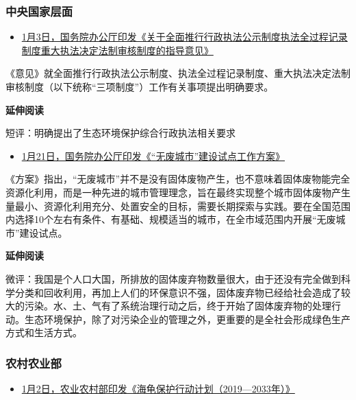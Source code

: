 \documentclass[]{book}
\providecommand{\tightlist}{%
  \setlength{\itemsep}{0pt}\setlength{\parskip}{0pt}}
\begin{document}
\hypertarget{ux4e2dux592eux56fdux5bb6ux5c42ux9762-2}{%
\subsubsection*{中央国家层面}\label{ux4e2dux592eux56fdux5bb6ux5c42ux9762-2}}

\begin{itemize}
\tightlist
\item
  \href{http://www.gov.cn/xinwen/2019-01/03/content_5354578.htm}{1月3日，国务院办公厅印发《关于全面推行行政执法公示制度执法全过程记录制度重大执法决定法制审核制度的指导意见》}
\end{itemize}

《意见》就全面推行行政执法公示制度、执法全过程记录制度、重大执法决定法制审核制度（以下统称``三项制度''）工作有关事项提出明确要求。

\textbf{延伸阅读}

短评：明确提出了生态环境保护综合行政执法相关要求

\begin{itemize}
\tightlist
\item
  \href{http://www.gov.cn/zhengce/content/2019-01/21/content_5359620.htm}{1月21日，国务院办公厅印发《``无废城市''建设试点工作方案》}
\end{itemize}

《方案》指出，``无废城市''并不是没有固体废物产生，也不意味着固体废物能完全资源化利用，而是一种先进的城市管理理念，旨在最终实现整个城市固体废物产生量最小、资源化利用充分、处置安全的目标，需要长期探索与实践。要在全国范围内选择10个左右有条件、有基础、规模适当的城市，在全市域范围内开展``无废城市''建设试点。

\textbf{延伸阅读}

微评：我国是个人口大国，所排放的固体废弃物数量很大，由于还没有完全做到科学分类和回收利用，再加上人们的环保意识不强，固体废弃物已经给社会造成了较大的污染。水、土、气有了系统治理行动之后，终于开始了固体废弃物的处理行动。生态环境保护，除了对污染企业的管理之外，更重要的是全社会形成绿色生产方式和生活方式。

\hypertarget{ux519cux6751ux519cux4e1aux90e8}{%
\subsubsection*{农村农业部}\label{ux519cux6751ux519cux4e1aux90e8}}

\begin{itemize}
\tightlist
\item
  \href{http://env.people.com.cn/n1/2018/1211/c1010-30460351.html}{1月2日，农业农村部印发《海龟保护行动计划（2019---2033年）》}
\end{itemize}
\end{document}
